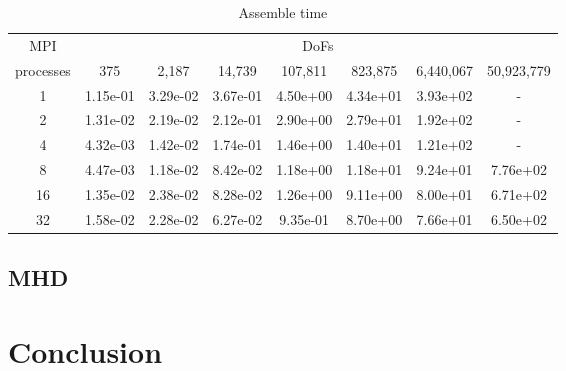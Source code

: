 \documentclass{article}
\begin{document}
\begin{table}[h!]
    \centering
    \begin{tabular}{|c|ccccccc|}
        \hline
        MPI & \multicolumn{7}{c|}{DoFs}\\
        processes &   375     &   2,187    &   14,739   &   107,811  &   823,875  &   6,440,067  & 50,923,779 \\
        \hline
        1 &  1.15e-01 &  3.29e-02 &  3.67e-01 &  4.50e+00 &  4.34e+01 &  3.93e+02 & - \\
        2 &  1.31e-02 &  2.19e-02 &  2.12e-01 &  2.90e+00 &  2.79e+01 &  1.92e+02 & - \\
        4 &  4.32e-03 &  1.42e-02 &  1.74e-01 &  1.46e+00 &  1.40e+01 &  1.21e+02 & - \\
        8 &  4.47e-03 &  1.18e-02 &  8.42e-02 &  1.18e+00 &  1.18e+01 &  9.24e+01 & 7.76e+02 \\
        16 &  1.35e-02 &  2.38e-02 &  8.28e-02 &  1.26e+00 &  9.11e+00 &  8.00e+01 & 6.71e+02 \\
        32 &  1.58e-02 &  2.28e-02 &  6.27e-02 &  9.35e-01 &  8.70e+00 &  7.66e+01 & 6.50e+02 \\

        \hline
    \end{tabular}
    \caption{Assemble time}
\end{table}
\subsection{MHD}

\section{Conclusion}
\end{document}
